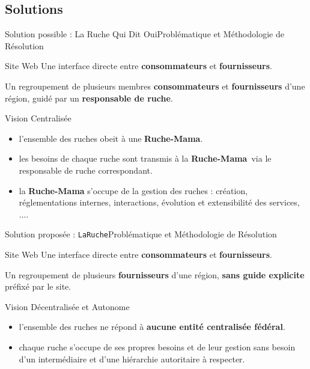 \documentclass{beamer}
\begin{document}
\subsection{Solutions}
\begin{frame}{Solution possible : La Ruche Qui Dit Oui}{Problématique et Méthodologie de Résolution}
\begin{block}{Site Web}
Une interface directe entre \textbf{consommateurs} et \textbf{fournisseurs}.
\end{block}

\begin{definition}[Ruche]
Un regroupement de plusieurs membres \textbf{consommateurs} et \textbf{fournisseurs} d'une région, guidé par un \textbf{responsable de ruche}.
\end{definition}

\begin{block}{Vision Centralisée}
\begin{itemize}
  \item l'ensemble des ruches obeit à une \textbf{Ruche-Mama}.
  \item les besoins de chaque ruche sont transmis à la \textbf{Ruche-Mama} via le responsable de ruche correspondant.
  \item la \textbf{Ruche-Mama} s'occupe de la gestion des ruches : création, réglementations internes, interactions, évolution et extensibilité des services, $\dots$.
\end{itemize}
\end{block}
\end{frame}

\begin{frame}{Solution proposée : \texttt{LaRuche}}{Problématique et Méthodologie de Résolution}
\begin{block}{Site Web}
Une interface directe entre \textbf{consommateurs} et \textbf{fournisseurs}.
\end{block}

\begin{definition}[Ruche]
Un regroupement de plusieurs \textbf{fournisseurs} d'une région, \textbf{sans guide explicite} préfixé par le site.
\end{definition}

\begin{block}{Vision Décentralisée et Autonome}
\begin{itemize}
  \item l'ensemble des ruches ne répond à \textbf{aucune entité centralisée fédéral}.
  \item chaque ruche s'occupe de ses propres besoins et de leur gestion sans besoin d'un intermédiaire et d'une hiérarchie autoritaire à respecter.
\end{itemize}
\end{block}
\end{frame}
\end{document}
